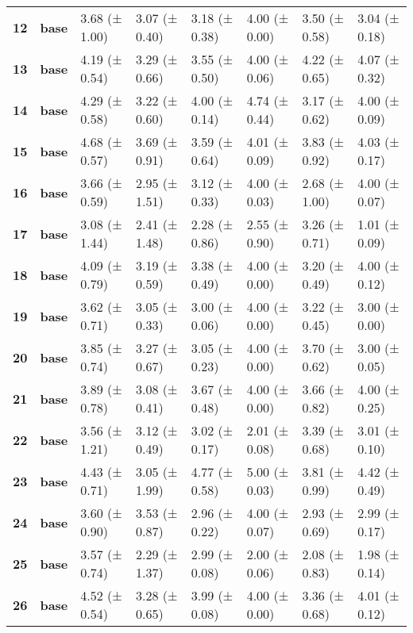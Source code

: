 \begin{longtable}{llllllll}
\cline{1-8}
\textbf{12} & \textbf{base} & 3.68 (± 1.00) & 3.07 (± 0.40) & 3.18 (± 0.38) & 4.00 (± 0.00) & 3.50 (± 0.58) & 3.04 (± 0.18) \\
\cline{1-8}
\textbf{13} & \textbf{base} & 4.19 (± 0.54) & 3.29 (± 0.66) & 3.55 (± 0.50) & 4.00 (± 0.06) & 4.22 (± 0.65) & 4.07 (± 0.32) \\
\cline{1-8}
\textbf{14} & \textbf{base} & 4.29 (± 0.58) & 3.22 (± 0.60) & 4.00 (± 0.14) & 4.74 (± 0.44) & 3.17 (± 0.62) & 4.00 (± 0.09) \\
\cline{1-8}
\textbf{15} & \textbf{base} & 4.68 (± 0.57) & 3.69 (± 0.91) & 3.59 (± 0.64) & 4.01 (± 0.09) & 3.83 (± 0.92) & 4.03 (± 0.17) \\
\cline{1-8}
\textbf{16} & \textbf{base} & 3.66 (± 0.59) & 2.95 (± 1.51) & 3.12 (± 0.33) & 4.00 (± 0.03) & 2.68 (± 1.00) & 4.00 (± 0.07) \\
\cline{1-8}
\textbf{17} & \textbf{base} & 3.08 (± 1.44) & 2.41 (± 1.48) & 2.28 (± 0.86) & 2.55 (± 0.90) & 3.26 (± 0.71) & 1.01 (± 0.09) \\
\cline{1-8}
\textbf{18} & \textbf{base} & 4.09 (± 0.79) & 3.19 (± 0.59) & 3.38 (± 0.49) & 4.00 (± 0.00) & 3.20 (± 0.49) & 4.00 (± 0.12) \\
\cline{1-8}
\textbf{19} & \textbf{base} & 3.62 (± 0.71) & 3.05 (± 0.33) & 3.00 (± 0.06) & 4.00 (± 0.00) & 3.22 (± 0.45) & 3.00 (± 0.00) \\
\cline{1-8}
\textbf{20} & \textbf{base} & 3.85 (± 0.74) & 3.27 (± 0.67) & 3.05 (± 0.23) & 4.00 (± 0.00) & 3.70 (± 0.62) & 3.00 (± 0.05) \\
\cline{1-8}
\textbf{21} & \textbf{base} & 3.89 (± 0.78) & 3.08 (± 0.41) & 3.67 (± 0.48) & 4.00 (± 0.00) & 3.66 (± 0.82) & 4.00 (± 0.25) \\
\cline{1-8}
\textbf{22} & \textbf{base} & 3.56 (± 1.21) & 3.12 (± 0.49) & 3.02 (± 0.17) & 2.01 (± 0.08) & 3.39 (± 0.68) & 3.01 (± 0.10) \\
\cline{1-8}
\textbf{23} & \textbf{base} & 4.43 (± 0.71) & 3.05 (± 1.99) & 4.77 (± 0.58) & 5.00 (± 0.03) & 3.81 (± 0.99) & 4.42 (± 0.49) \\
\cline{1-8}
\textbf{24} & \textbf{base} & 3.60 (± 0.90) & 3.53 (± 0.87) & 2.96 (± 0.22) & 4.00 (± 0.07) & 2.93 (± 0.69) & 2.99 (± 0.17) \\
\cline{1-8}
\textbf{25} & \textbf{base} & 3.57 (± 0.74) & 2.29 (± 1.37) & 2.99 (± 0.08) & 2.00 (± 0.06) & 2.08 (± 0.83) & 1.98 (± 0.14) \\
\cline{1-8}
\textbf{26} & \textbf{base} & 4.52 (± 0.54) & 3.28 (± 0.65) & 3.99 (± 0.08) & 4.00 (± 0.00) & 3.36 (± 0.68) & 4.01 (± 0.12) \\

\end{longtable}
